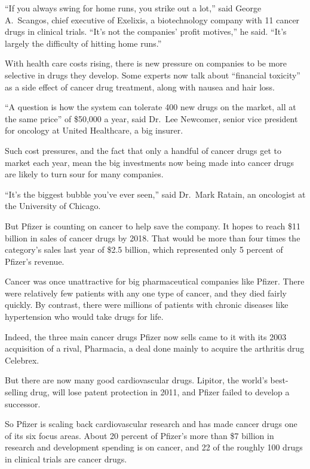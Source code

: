 ﻿\documentclass[12pt]{article}
\begin{document}
``If you always swing for home runs, you strike out a lot,'' said George A.~Scangos, chief executive
of Exelixis, a biotechnology company with 11 cancer drugs in clinical trials. ``It's not the
companies' profit motives,'' he said. ``It's largely the difficulty of hitting home runs.''

With health care costs rising, there is new pressure on companies to be more selective in drugs they
develop. Some experts now talk about ``financial toxicity'' as a side effect of cancer drug
treatment, along with nausea and hair loss.

``A question is how the system can tolerate 400 new drugs on the market, all at the same price'' of
\$50,000 a year, said Dr.~Lee Newcomer, senior vice president for oncology at United Healthcare, a
big insurer.

Such cost pressures, and the fact that only a handful of cancer drugs get to market each year, mean
the big investments now being made into cancer drugs are likely to turn sour for many companies.

``It's the biggest bubble you've ever seen,'' said Dr.~Mark Ratain, an oncologist at the University
of Chicago.

But Pfizer is counting on cancer to help save the company. It hopes to reach \$11 billion in sales
of cancer drugs by 2018. That would be more than four times the category's sales last year of \$2.5
billion, which represented only 5 percent of Pfizer's revenue.

Cancer was once unattractive for big pharmaceutical companies like Pfizer. There were relatively few
patients with any one type of cancer, and they died fairly quickly. By contrast, there were millions
of patients with chronic diseases like hypertension who would take drugs for life.

Indeed, the three main cancer drugs Pfizer now sells came to it with its 2003 acquisition of a
rival, Pharmacia, a deal done mainly to acquire the arthritis drug Celebrex.

But there are now many good cardiovascular drugs. Lipitor, the world's best-selling drug, will lose
patent protection in 2011, and Pfizer failed to develop a successor.

So Pfizer is scaling back cardiovascular research and has made cancer drugs one of its six focus
areas. About 20 percent of Pfizer's more than \$7 billion in research and development spending is on
cancer, and 22 of the roughly 100 drugs in clinical trials are cancer drugs.
\end{document}

